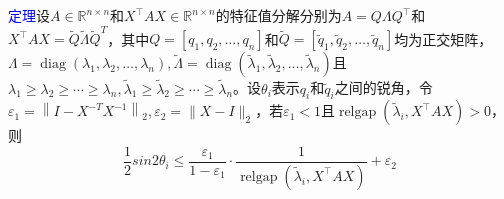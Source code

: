 \documentclass[notheorems,serif]{beamer}
\begin{document}
\begin{frame}

\textcolor{blue}{定理}\quad 设$A \in \mathbb{R}^{n \times n}$和$X^{\top} A X \in \mathbb{R}^{n \times n}$的特征值分解分别为$A=Q \Lambda Q^{\top}$和$X^{\top} A X=\tilde{Q} \tilde{\Lambda} \tilde{Q}^T$，其中$Q=\left[q_{1}, q_{2}, \ldots, q_{n}\right]$和$\tilde{Q}=\left[\tilde{q}_{1}, \tilde{q}_{2}, \ldots, \tilde{q}_{n}\right]$均为正交矩阵，$\Lambda=\operatorname{diag}\left(\lambda_{1}, \lambda_{2}, \ldots, \lambda_{n}\right), \tilde{\Lambda}=\operatorname{diag}\left(\tilde{\lambda}_{1}, \tilde{\lambda}_{2}, \ldots, \tilde{\lambda}_{n}\right)$且$\lambda_{1} \geq \lambda_{2} \geq \cdots \geq \lambda_{n}, \tilde{\lambda}_{1} \geq \tilde{\lambda}_{2} \geq \cdots \geq \tilde{\lambda}_{n}$。设$\theta_{i}$表示$q_i$和$\tilde{q}_{i}$之间的锐角，令$\varepsilon_{1}=\left\|I-X^{-T} X^{-1}\right\|_{2}, \varepsilon_{2}=\|X-I\|_{2}$，若$\varepsilon_{1}<1$且$\operatorname{relgap}\left(\tilde{\lambda}_{i}, X^{\top} A X\right)>0$，则
$$
\frac{1}{2} sin2 \theta_{i} \leq \frac{\varepsilon_{1}}{1-\varepsilon_{1}} \cdot \frac{1}{\operatorname {relgap}\left(\tilde {\lambda}_{i}, X^{\top} A X\right)}+\varepsilon_{2}
$$\end{frame}
\end{document}
